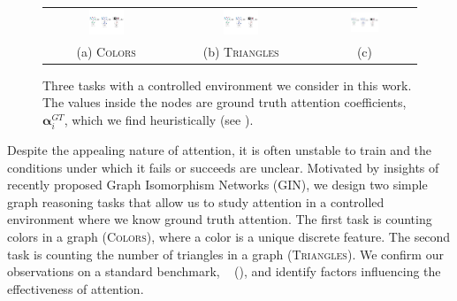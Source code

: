 \begin{figure}[t]
	\begin{center}
		\small
		\begin{tabular}{ccc}
			{\includegraphics[width=0.3\textwidth, align=c, trim={0cm 6.5cm 20.7cm 6cm}, clip]{tasks}} &
			{\includegraphics[width=0.27\textwidth, align=c, trim={10cm 6cm 10.8cm 6.1cm}, clip]{tasks}} &
			{\includegraphics[width=0.3\textwidth, align=c, trim={20cm 6cm 0.3cm 6cm}, clip]{tasks}} \\
			(a) \textsc{Colors} & (b) \textsc{Triangles} & (c) \mnistfull \\
		\end{tabular}
	\end{center}
	\vspace{-10pt}
	\caption{\small Three tasks with a controlled environment we consider in this work. The values inside the nodes are ground truth attention coefficients, $\mathbf{\alpha}_i^{GT}$, which we find heuristically (see \secref{\ref{sec:datasets}}).}
	\label{fig:tasks}
\end{figure}
%
Despite the appealing nature of attention, it is often unstable to train and the conditions under which it fails or succeeds are unclear.
Motivated by insights of~\citep{xu2018powerful} recently proposed Graph Isomorphism Networks (GIN), we design two simple graph reasoning tasks
that allow us to study attention in a controlled environment where we know ground truth attention.
The first task is counting colors in a graph (\textsc{Colors}), where a color is a unique discrete feature. The second task is counting the number of triangles in a graph (\textsc{Triangles}). We confirm our observations on a standard benchmark, \mnistfull~\citep{lecun1998gradient} (\fig{\ref{fig:tasks}}), and identify factors influencing the effectiveness of attention.

